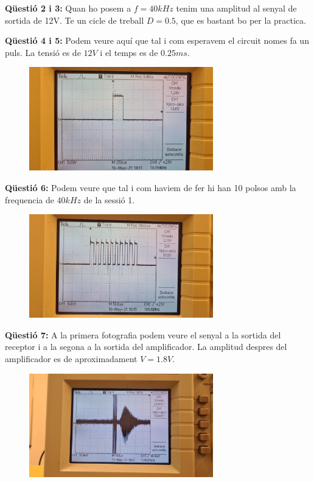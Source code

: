 \documentclass[12pt, a4papre]{article}
\begin{document}
	\textbf{Qüestió 2 i 3:} Quan ho posem a  $f = 40kHz$ tenim una amplitud al senyal de sortida de 12V. Te un cicle de treball $D = 0.5$, que es bastant bo per la practica.
	
	\textbf{Qüestió 4 i 5:} Podem veure aquí que tal i com esperavem el circuit nomes fa un puls. La tensió es de $12V$ i el temps es de $0.25ms$.
		
	\begin{figure}[H]
		\begin{center}
		\includegraphics[width=80mm]{p4_4_2.jpeg}
		\end{center}
	\end{figure}
	
	\textbf{Qüestió 6:} Podem veure que tal i com haviem de fer hi han 10 polsos amb la frequencia de $40kHz$ de la sessió 1.
	
	\begin{figure}[H]
		\begin{center}
		\includegraphics[width=80mm]{p4_8.jpeg}
		\end{center}
	\end{figure}
	
	\textbf{Qüestió 7:} A la primera fotografia podem veure el senyal a la sortida del receptor i a la segona a la sortida del amplificador. La amplitud despres del amplificador es de aproximadament $V = 1.8V$.
	
	\begin{figure}[H]
		\begin{center}
		\includegraphics[width=80mm]{p4_9.jpeg}
		\end{center}
	\end{figure}
	
\end{document}
